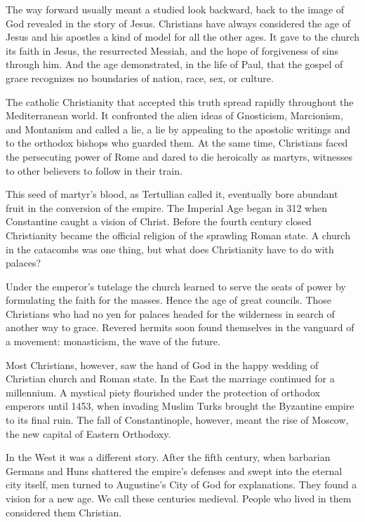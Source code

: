 The way forward usually meant a studied look backward, back to the image of God revealed in the
story of Jesus. Christians have always considered the age of Jesus and his apostles a kind of model
for all the other ages. It gave to the church its faith in Jesus, the resurrected Messiah, and the
hope of forgiveness of sins through him. And the age demonstrated, in the life of Paul, that the
gospel of grace recognizes no boundaries of nation, race, sex, or culture.

The catholic Christianity that accepted this truth spread rapidly throughout the Mediterranean
world. It confronted the alien ideas of Gnosticism, Marcionism, and Montanism and called a lie, a
lie by appealing to the apostolic writings and to the orthodox bishops who guarded them. At the same
time, Christians faced the persecuting power of Rome and dared to die heroically as martyrs,
witnesses to other believers to follow in their train.

This seed of martyr’s blood, as Tertullian called it, eventually bore abundant fruit in the
conversion of the empire. The Imperial Age began in 312 when Constantine caught a vision of Christ.
Before the fourth century closed Christianity became the official religion of the sprawling Roman
state. A church in the catacombs was one thing, but what does Christianity have to do with palaces?

Under the emperor’s tutelage the church learned to serve the seats of power by formulating the faith
for the masses. Hence the age of great councils. Those Christians who had no yen for palaces headed
for the wilderness in search of another way to grace. Revered hermits soon found themselves in the
vanguard of a movement: monasticism, the wave of the future.

Most Christians, however, saw the hand of God in the happy wedding of Christian church and Roman
state. In the East the marriage continued for a millennium. A mystical piety flourished under the
protection of orthodox emperors until 1453, when invading Muslim Turks brought the Byzantine empire
to its final ruin. The fall of Constantinople, however, meant the rise of Moscow, the new capital of
Eastern Orthodoxy.

In the West it was a different story. After the fifth century, when barbarian Germans and Huns
shattered the empire’s defenses and swept into the eternal city itself, men turned to Augustine’s
City of God for explanations. They found a vision for a new age. We call these centuries medieval.
People who lived in them considered them Christian.

